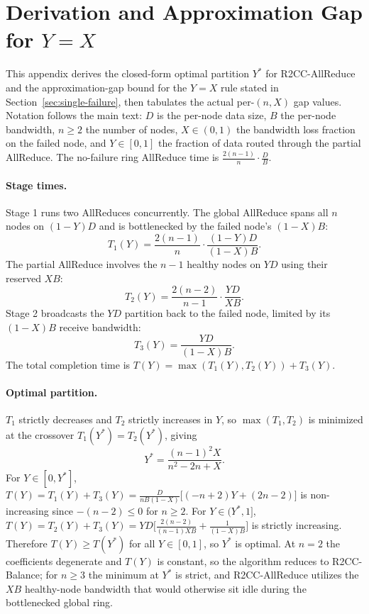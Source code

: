 \clearpage
\appendix
\section{Derivation and Approximation Gap for $Y = X$}\label{appendix:allreduce-math}

This appendix derives the closed-form optimal partition $Y^*$ for R2CC-AllReduce and the approximation-gap bound for the $Y = X$ rule stated in Section~\ref{sec:single-failure}, then tabulates the actual per-$(n, X)$ gap values. Notation follows the main text: $D$ is the per-node data size, $B$ the per-node bandwidth, $n \geq 2$ the number of nodes, $X \in (0, 1)$ the bandwidth loss fraction on the failed node, and $Y \in [0, 1]$ the fraction of data routed through the partial AllReduce. The no-failure ring AllReduce time is $\frac{2(n-1)}{n} \cdot \frac{D}{B}$.

\paragraph{Stage times.} Stage 1 runs two AllReduces concurrently. The global AllReduce spans all $n$ nodes on $(1-Y)D$ and is bottlenecked by the failed node's $(1-X)B$:
$$T_1(Y) = \frac{2(n-1)}{n} \cdot \frac{(1-Y)D}{(1-X)B}.$$
The partial AllReduce involves the $n-1$ healthy nodes on $YD$ using their reserved $XB$:
$$T_2(Y) = \frac{2(n-2)}{n-1} \cdot \frac{YD}{XB}.$$
Stage 2 broadcasts the $YD$ partition back to the failed node, limited by its $(1-X)B$ receive bandwidth:
$$T_3(Y) = \frac{YD}{(1-X)B}.$$
The total completion time is $T(Y) = \max(T_1(Y), T_2(Y)) + T_3(Y)$.

\paragraph{Optimal partition.} $T_1$ strictly decreases and $T_2$ strictly increases in $Y$, so $\max(T_1, T_2)$ is minimized at the crossover $T_1(Y^*) = T_2(Y^*)$, giving
$$Y^* = \frac{(n-1)^2 X}{n^2 - 2n + X}.$$
For $Y \in [0, Y^*]$, $T(Y) = T_1(Y) + T_3(Y) = \frac{D}{nB(1-X)}\bigl[(-n+2)Y + (2n-2)\bigr]$ is non-increasing since $-(n-2) \leq 0$ for $n \geq 2$. For $Y \in (Y^*, 1]$, $T(Y) = T_2(Y) + T_3(Y) = YD\bigl[\frac{2(n-2)}{(n-1)XB} + \frac{1}{(1-X)B}\bigr]$ is strictly increasing. Therefore $T(Y) \geq T(Y^*)$ for all $Y \in [0, 1]$, so $Y^*$ is optimal. At $n = 2$ the coefficients degenerate and $T(Y)$ is constant, so the algorithm reduces to R2CC-Balance; for $n \geq 3$ the minimum at $Y^*$ is strict, and R2CC-AllReduce utilizes the $XB$ healthy-node bandwidth that would otherwise sit idle during the bottlenecked global ring.

